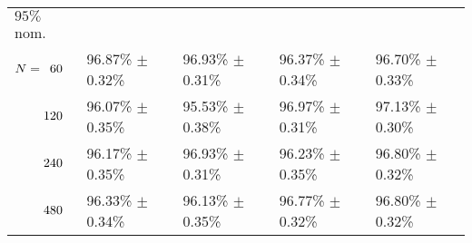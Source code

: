 \begin{onehalfspace}
\begin{table}[htbp]
\begin{tabular}{@{}p{}*{4}{L{\tabcolsep\relax}}@{}}
$95\%$ nom.  \\[-0.4em]
$N = \hphantom{1}60$ & 96.87\% $\pm$ 0.32\% & 96.93\% $\pm$ 0.31\% & 96.37\% $\pm$ 0.34\% & 96.70\% $\pm$ 0.33\% \\[-0.4em]
$\hphantom{N{}={}}120$ & 96.07\% $\pm$ 0.35\% & 95.53\% $\pm$ 0.38\% & 96.97\% $\pm$ 0.31\% & 97.13\% $\pm$ 0.30\% \\[-0.4em]
$\hphantom{N{}={}}240$ & 96.17\% $\pm$ 0.35\% & 96.93\% $\pm$ 0.31\% & 96.23\% $\pm$ 0.35\% & 96.80\% $\pm$ 0.32\% \\[-0.4em]
$\hphantom{N{}={}}480$ & 96.33\% $\pm$ 0.34\% & 96.13\% $\pm$ 0.35\% & 96.77\% $\pm$ 0.32\% & 96.80\% $\pm$ 0.32\% \\
\bottomrule
\end{tabular}
\label{tbl:supp_CI_3D_results}
\end{table}


\end{onehalfspace}
